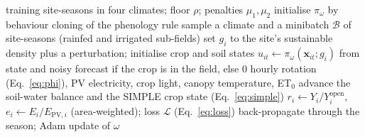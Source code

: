 \begin{algorithm}[t]
\caption{SALS training}\label{alg:sals}
\begin{algorithmic}[1]
\Require training site-seasons in four climates; floor $\rho$; penalties $\mu_1,\mu_2$
\State initialise $\pi_\omega$ by behaviour cloning of the phenology rule
  \State sample a climate and a minibatch $\mathcal{B}$ of site-seasons (rainfed and irrigated sub-fields)
  \State set $g_i$ to the site's sustainable density plus a perturbation; initialise crop and soil states
    \State $u_{it}\gets\pi_\omega(\mathbf{x}_{it};g_i)$ from state and noisy forecast if the crop is in the field, else $0$
    \State hourly rotation (Eq.~\ref{eq:phi}), PV electricity, crop light, canopy temperature, ET$_0$
    \State advance the soil-water balance and the SIMPLE crop state (Eq.~\ref{eq:simple})
  \EndFor
  \State $r_i\gets Y_i/Y_i^{\mathrm{open}}$, $e_i\gets E_i/E_{\mathrm{PV},i}$ (area-weighted); loss $\mathcal{L}$ (Eq.~\ref{eq:loss})
  \State back-propagate through the season; Adam update of $\omega$
\EndFor
\end{algorithmic}
\end{algorithm}

